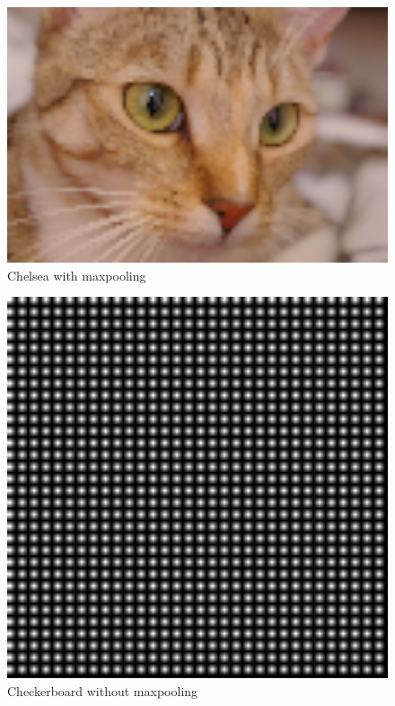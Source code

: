 \begin{figure}[]
    \centering
    \includegraphics[width=1.00\textwidth]{figures/image_processed/chelsea_maxpooled.png}
    \caption{Chelsea with maxpooling}
    \label{fig:chelsea_maxpooled}
\end{figure}

\begin{figure}[]
    \centering
    \includegraphics[width=1.00\textwidth]{figures/image_processed/checkerboard.png}
    \caption{Checkerboard without maxpooling}
    \label{fig:checkerboard_original}
\end{figure}

